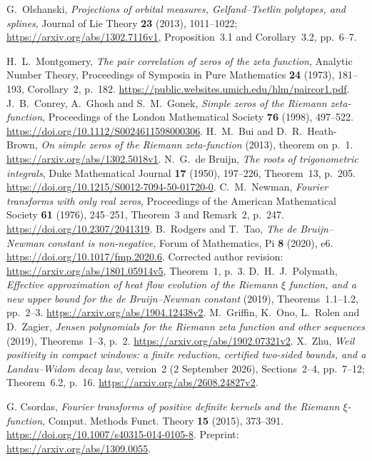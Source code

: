  G.~Olshanski, \emph{Projections of orbital measures, Gelfand--Tsetlin polytopes, and splines}, Journal of Lie Theory \textbf{23} (2013), 1011--1022; \url{https://arxiv.org/abs/1302.7116v1}, Proposition~3.1 and Corollary~3.2, pp.~6--7.


 H.~L.~Montgomery, \emph{The pair correlation of zeros of the zeta function}, Analytic Number Theory, Proceedings of Symposia in Pure Mathematics \textbf{24} (1973), 181--193, Corollary~2, p.~182. \url{https://public.websites.umich.edu/hlm/paircor1.pdf}.
 J.~B.~Conrey, A.~Ghosh and S.~M.~Gonek, \emph{Simple zeros of the Riemann zeta-function}, Proceedings of the London Mathematical Society \textbf{76} (1998), 497--522. \url{https://doi.org/10.1112/S0024611598000306}.
 H.~M.~Bui and D.~R.~Heath-Brown, \emph{On simple zeros of the Riemann zeta-function} (2013), theorem on p.~1. \url{https://arxiv.org/abs/1302.5018v1}.
 N.~G.~de Bruijn, \emph{The roots of trigonometric integrals}, Duke Mathematical Journal \textbf{17} (1950), 197--226, Theorem~13, p.~205. \url{https://doi.org/10.1215/S0012-7094-50-01720-0}.
 C.~M.~Newman, \emph{Fourier transforms with only real zeros}, Proceedings of the American Mathematical Society \textbf{61} (1976), 245--251, Theorem~3 and Remark~2, p.~247. \url{https://doi.org/10.2307/2041319}.
 B.~Rodgers and T.~Tao, \emph{The de Bruijn--Newman constant is non-negative}, Forum of Mathematics, Pi \textbf{8} (2020), e6. \url{https://doi.org/10.1017/fmp.2020.6}. Corrected author revision: \url{https://arxiv.org/abs/1801.05914v5}, Theorem~1, p.~3.
 D.~H.~J.~Polymath, \emph{Effective approximation of heat flow evolution of the Riemann $\xi$ function, and a new upper bound for the de Bruijn--Newman constant} (2019), Theorems~1.1--1.2, pp.~2--3. \url{https://arxiv.org/abs/1904.12438v2}.
 M.~Griffin, K.~Ono, L.~Rolen and D.~Zagier, \emph{Jensen polynomials for the Riemann zeta function and other sequences} (2019), Theorems~1--3, p.~2. \url{https://arxiv.org/abs/1902.07321v2}.
 X.~Zhu, \emph{Weil positivity in compact windows: a finite reduction, certified two-sided bounds, and a Landau--Widom decay law}, version~2 (2 September 2026), Sections~2--4, pp.~7--12; Theorem~6.2, p.~16. \url{https://arxiv.org/abs/2608.24827v2}.

G. Csordas, \emph{Fourier transforms of positive definite kernels and the Riemann
\(\xi\)-function}, Comput. Methods Funct. Theory \textbf{15} (2015), 373--391.
\url{https://doi.org/10.1007/s40315-014-0105-8}.
Preprint: \url{https://arxiv.org/abs/1309.0055}.


